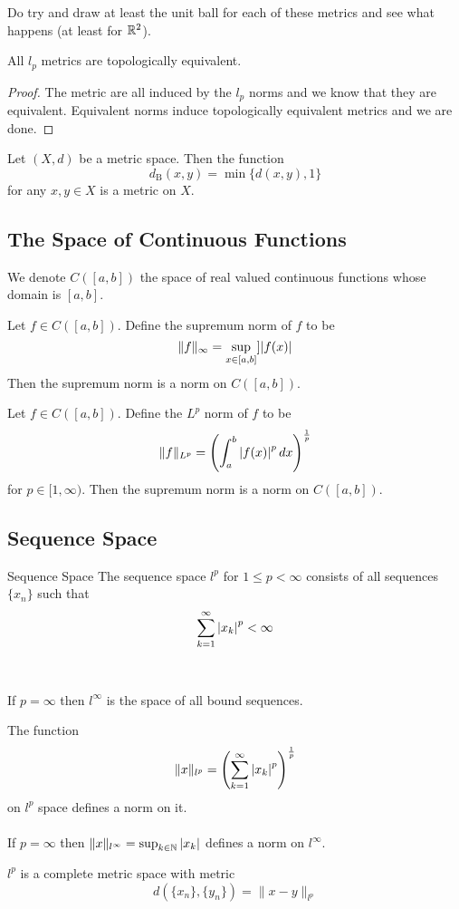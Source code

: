 \documentclass[a4paper]{article}
\begin{document}
Do try and draw at least the unit ball for each of these metrics and see what happens (at least for $\mathbb{R}^2$). 

\begin{prp}{}{} All $l_p$ metrics are topologically equivalent. \tcbline
\begin{proof}
The metric are all induced by the $l_p$ norms and we know that they are equivalent. Equivalent norms induce topologically equivalent metrics and we are done. 
\end{proof}
\end{prp}

\begin{prp}{}{} Let $(X,d)$ be a metric space. Then the function $$d_\text{B}(x,y)=\min\{d(x,y),1\}$$ for any $x,y\in X$ is a metric on $X$. 
\end{prp}

\subsection{The Space of Continuous Functions}
\begin{defn}{}{} We denote $C([a,b])$ the space of real valued continuous functions whose domain is $[a,b]$. 
\end{defn}

\begin{prp}{}{} Let $f\in C([a,b])$. Define the supremum norm of $f$ to be $$\|f\|_\infty=\sup_{x\in[a,b]}]\abs{f(x)}$$ Then the supremum norm is a norm on $C([a,b])$. 
\end{prp}

\begin{prp}{}{} Let $f\in C([a,b])$. Define the $L^p$ norm of $f$ to be $$\|f\|_{L^p}=\left(\int_a^b\abs{f(x)}^p\,dx\right)^{\frac{1}{p}}$$ for $p\in[1,\infty)$. Then the supremum norm is a norm on $C([a,b])$. 
\end{prp}

\subsection{Sequence Space}
\begin{defn}{Sequence Space}{} The sequence space $l^p$ for $1\leq p<\infty$ consists of all sequences $\{x_n\}$ such that $$\sum_{k=1}^\infty\abs{x_k}^p<\infty$$ \\~\\
If $p=\infty$ then $l^\infty$ is the space of all bound sequences. 
\end{defn}

\begin{prp}{}{} The function $$\|x\|_{l^p}=\left(\sum_{k=1}^\infty\abs{x_k}^p\right)^{\frac{1}{p}}$$ on $l^p$ space defines a norm on it. \\~\\ If $p=\infty$ then $\|x\|_{l^\infty}=\sup_{k\in\mathbb{N}}\abs{x_k}$ defines a norm on $l^\infty$. 
\end{prp}

\begin{prp}{}{} $l^p$ is a complete metric space with metric $$d(\{x_n\},\{y_n\})=\|x-y\|_{l^p}$$
\end{prp}
\end{document}
